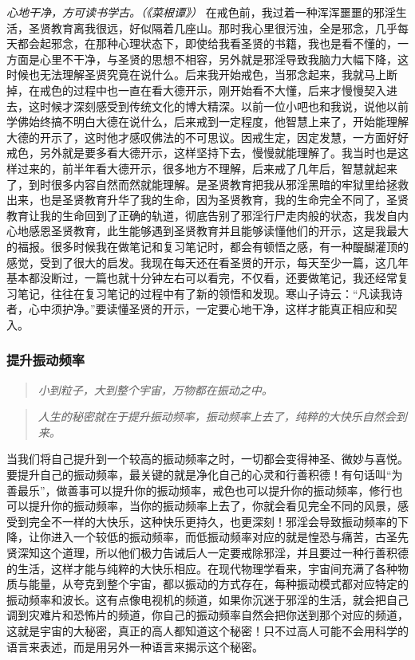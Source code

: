 \textit{心地干净，方可读书学古。（《菜根谭》）} 在戒色前，我过着一种浑浑噩噩的邪淫生活，圣贤教育离我很远，好似隔着几座山。那时我心里很污浊，全是邪念，几乎每天都会起邪念，在那种心理状态下，即使给我看圣贤的书籍，我也是看不懂的，一方面是心里不干净，与圣贤的思想不相容，另外就是邪淫导致我脑力大幅下降，这时候也无法理解圣贤究竟在说什么。后来我开始戒色，当邪念起来，我就马上断掉，在戒色的过程中也一直在看大德开示，刚开始看不大懂，后来才慢慢契入进去，这时候才深刻感受到传统文化的博大精深。以前一位小吧也和我说，说他以前学佛始终搞不明白大德在说什么，后来戒到一定程度，他智慧上来了，开始能理解大德的开示了，这时他才感叹佛法的不可思议。因戒生定，因定发慧，一方面好好戒色，另外就是要多看大德开示，这样坚持下去，慢慢就能理解了。我当时也是这样过来的，前半年看大德开示，很多地方不理解，后来戒了几年后，智慧就起来了，到时很多内容自然而然就能理解。是圣贤教育把我从邪淫黑暗的牢狱里给拯救出来，也是圣贤教育升华了我的生命，因为圣贤教育，我的生命完全不同了，圣贤教育让我的生命回到了正确的轨道，彻底告别了邪淫行尸走肉般的状态，我发自内心地感恩圣贤教育，此生能够遇到圣贤教育并且能够读懂他们的开示，这是我最大的福报。很多时候我在做笔记和复习笔记时，都会有顿悟之感，有一种醍醐灌顶的感觉，受到了很大的启发。我现在每天还在看圣贤的开示，每天至少一篇，这几年基本都没断过，一篇也就十分钟左右可以看完，不仅看，还要做笔记，我还经常复习笔记，往往在复习笔记的过程中有了新的领悟和发现。寒山子诗云：“凡读我诗者，心中须护净。”要读懂圣贤的开示，一定要心地干净，这样才能真正相应和契入。

\subsubsection{提升振动频率}

\begin{quote}\it
    小到粒子，大到整个宇宙，万物都在振动之中。
\end{quote}

\begin{quote}\it
    人生的秘密就在于提升振动频率，振动频率上去了，纯粹的大快乐自然会到来。
\end{quote}

当我们将自己提升到一个较高的振动频率之时，一切都会变得神圣、微妙与喜悦。要提升自己的振动频率，最关键的就是净化自己的心灵和行善积德！有句话叫“为善最乐”，做善事可以提升你的振动频率，戒色也可以提升你的振动频率，修行也可以提升你的振动频率，当你的振动频率上去了，你就会看见完全不同的风景，感受到完全不一样的大快乐，这种快乐更持久，也更深刻！邪淫会导致振动频率的下降，让你进入一个较低的振动频率，而低振动频率对应的就是惶恐与痛苦，古圣先贤深知这个道理，所以他们极力告诫后人一定要戒除邪淫，并且要过一种行善积德的生活，这样才能与纯粹的大快乐相应。在现代物理学看来，宇宙间充满了各种物质与能量，从夸克到整个宇宙，都以振动的方式存在，每种振动模式都对应特定的振动频率和波长。这有点像电视机的频道，如果你沉迷于邪淫的生活，就会把自己调到灾难片和恐怖片的频道，你自己的振动频率自然会把你送到那个对应的频道，这就是宇宙的大秘密，真正的高人都知道这个秘密！只不过高人可能不会用科学的语言来表述，而是用另外一种语言来揭示这个秘密。

